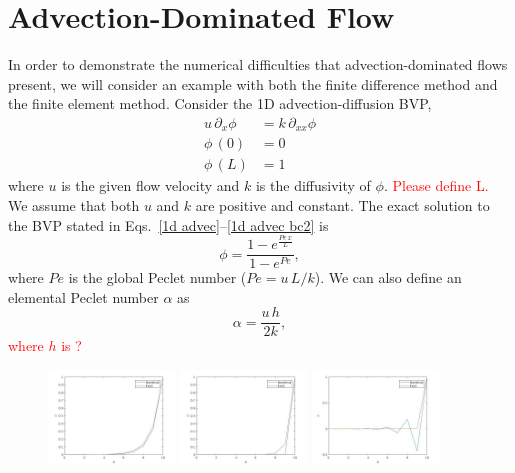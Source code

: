 \section{Advection-Dominated Flow}
In order to demonstrate the numerical difficulties that advection-dominated flows present, we will consider an example with both the finite difference method and the finite element method. Consider the 1D advection-diffusion BVP,
\begin{align}
    \label{1d advec}
    u\, \partial_{x}\phi &= k\, \partial_{xx}\phi
    \\
    \label{1d advec bc1}
    \phi\,(0) &= 0
    \\
    \label{1d advec bc2}
    \phi\,(L) &= 1
\end{align}
where $u$ is the given flow velocity and $k$ is the diffusivity of $\phi$. \textcolor{red}{Please define L.} We assume that both $u$ and $k$ are positive and constant. The exact solution to the BVP stated in Eqs.~\eqref{1d advec}--\eqref{1d advec bc2} is
\begin{equation}
    \phi= \frac{1-e^{\frac{Pe\,x}{L}}}{1-e^{Pe}},
\end{equation}
where $Pe$ is the global Peclet number ($Pe=u\,L/k$). We can also define an elemental Peclet number $\alpha$ as
\begin{equation}
    \alpha=\frac{u\,h}{2k},
\end{equation}
\textcolor{red}{where $h$ is ?}
\begin{figure}
    \centering
        \includegraphics[width=0.3\textwidth]{Chapter-1/Figures/alpha_5}
       \includegraphics[width=0.3\textwidth]{Chapter-1/Figures/alpha1}
        \includegraphics[width=0.3\textwidth]{Chapter-1/Figures/alpha2_5}
\end{figure}